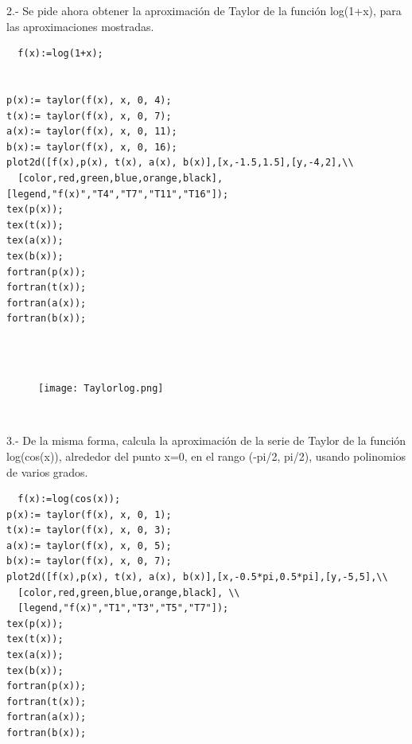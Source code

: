 \documentclass[12pt]{article}
\begin{document}
  2.- Se pide ahora obtener la aproximación de Taylor de la función log(1+x), para las aproximaciones mostradas.
  \begin{verbatim}
  f(x):=log(1+x);


p(x):= taylor(f(x), x, 0, 4);
t(x):= taylor(f(x), x, 0, 7);
a(x):= taylor(f(x), x, 0, 11);
b(x):= taylor(f(x), x, 0, 16);
plot2d([f(x),p(x), t(x), a(x), b(x)],[x,-1.5,1.5],[y,-4,2],\\
  [color,red,green,blue,orange,black], [legend,"f(x)","T4","T7","T11","T16"]);
tex(p(x));
tex(t(x));
tex(a(x));
tex(b(x));
fortran(p(x));
fortran(t(x));
fortran(a(x));
fortran(b(x));


     \end{verbatim}\\
  \begin{center}
  \begin{figure}[b]
\texttt{[image: Taylorlog.png]}
\end{figure}
  \end{center}\\
  \newpage
  
  3.- De la misma forma, calcula la aproximación de la serie de Taylor de la función log(cos(x)), alrededor del punto  x=0, en el rango (-pi/2, pi/2), usando polinomios de varios grados.\\
  \begin{verbatim}
  f(x):=log(cos(x));
p(x):= taylor(f(x), x, 0, 1);
t(x):= taylor(f(x), x, 0, 3);
a(x):= taylor(f(x), x, 0, 5);
b(x):= taylor(f(x), x, 0, 7);
plot2d([f(x),p(x), t(x), a(x), b(x)],[x,-0.5*pi,0.5*pi],[y,-5,5],\\
  [color,red,green,blue,orange,black], \\
  [legend,"f(x)","T1","T3","T5","T7"]);
tex(p(x));
tex(t(x));
tex(a(x));
tex(b(x));
fortran(p(x));
fortran(t(x));
fortran(a(x));
fortran(b(x));
      \end{verbatim}\\
 
\end{document}
